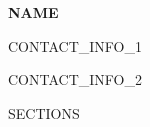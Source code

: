 \documentclass{article}
\newcommand{\name}[1]{
\begin{center}
\textbf{{\Large #1}}
\end{center}}
\newcommand{\contactinfo}[2]{
    \begin{center}
        #1

        #2
    \end{center}
}
\begin{document}
\name{NAME}

\contactinfo{CONTACT_INFO_1}{CONTACT_INFO_2}

SECTIONS
\end{document}
